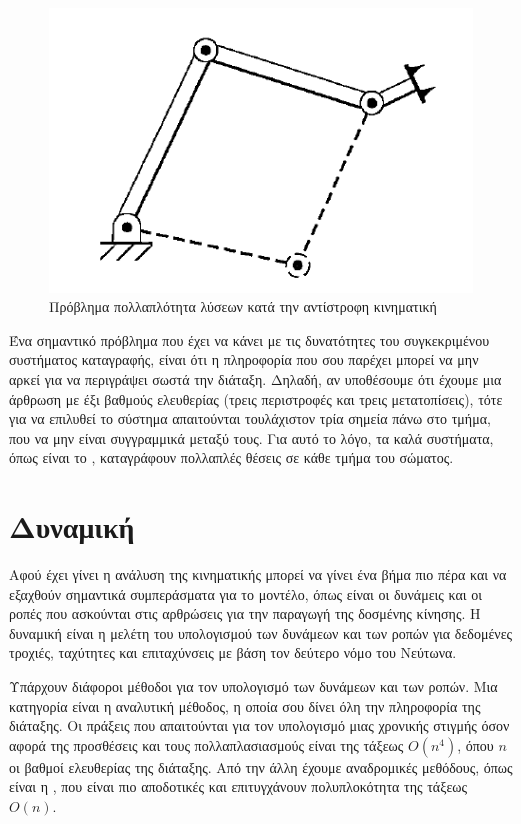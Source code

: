 \begin{figure}[H]
    \centering
    \includegraphics[width=.7\textwidth, height=.29\textheight, keepaspectratio]{fig/ik-multiple-solutions.png}
    \caption{Πρόβλημα πολλαπλότητα λύσεων κατά την αντίστροφη κινηματική \cite{craig95}}
    \label{fig:ik-multiple-solutions}
\end{figure}

Ένα σημαντικό πρόβλημα που έχει να κάνει με τις δυνατότητες του συγκεκριμένου συστήματος καταγραφής, είναι ότι η πληροφορία που σου παρέχει μπορεί να μην αρκεί για να περιγράψει σωστά την διάταξη. Δηλαδή, αν υποθέσουμε ότι έχουμε μια άρθρωση με έξι βαθμούς ελευθερίας (τρεις περιστροφές και τρεις μετατοπίσεις), τότε για να επιλυθεί το σύστημα απαιτούνται τουλάχιστον τρία σημεία πάνω στο τμήμα, που να μην είναι συγγραμμικά μεταξύ τους. Για αυτό το λόγο, τα καλά συστήματα, όπως είναι το , καταγράφουν πολλαπλές θέσεις σε κάθε τμήμα του σώματος.

\section{Δυναμική}

Αφού έχει γίνει η ανάλυση της κινηματικής μπορεί να γίνει ένα βήμα πιο πέρα και να εξαχθούν σημαντικά συμπεράσματα για το μοντέλο, όπως είναι οι δυνάμεις και οι ροπές που ασκούνται στις αρθρώσεις για την παραγωγή της δοσμένης κίνησης. Η δυναμική είναι η μελέτη του υπολογισμού των δυνάμεων και των ροπών για δεδομένες τροχιές, ταχύτητες και επιταχύνσεις με βάση τον δεύτερο νόμο του Νεύτωνα.

Υπάρχουν διάφοροι μέθοδοι για τον υπολογισμό των δυνάμεων και των ροπών. Μια κατηγορία είναι η αναλυτική μέθοδος, η οποία σου δίνει όλη την πληροφορία της διάταξης. Οι πράξεις που απαιτούνται για τον υπολογισμό μιας χρονικής στιγμής όσον αφορά της προσθέσεις και τους πολλαπλασιασμούς είναι της τάξεως $O(n^4)$, όπου $n$ οι βαθμοί ελευθερίας της διάταξης. Από την άλλη έχουμε αναδρομικές μεθόδους, όπως είναι η , που είναι πιο αποδοτικές και επιτυγχάνουν πολυπλοκότητα της τάξεως $O(n)$.

